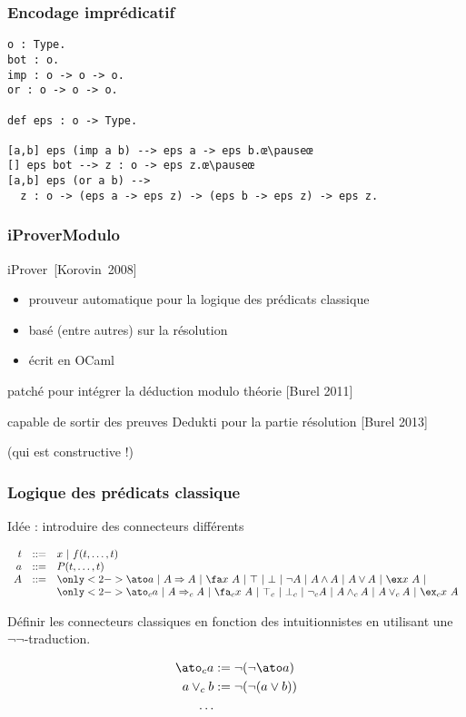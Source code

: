 \documentclass[12pt,aspectratio=169]{beamer}
\begin{document}
\begin{frame}[fragile]
  \frametitle{Encodage imprédicatif}
\begin{lstlisting}
o : Type.
bot : o.
imp : o -> o -> o.
or : o -> o -> o.

def eps : o -> Type.

[a,b] eps (imp a b) --> eps a -> eps b.œ\pauseœ
[] eps bot --> z : o -> eps z.œ\pauseœ
[a,b] eps (or a b) -->
  z : o -> (eps a -> eps z) -> (eps b -> eps z) -> eps z.
\end{lstlisting}


\end{frame}

\begin{frame}
\frametitle{iProverModulo}
iProver~[Korovin~2008] 
\begin{itemize}
\item prouveur automatique pour la logique des prédicats classique
\item basé (entre autres) sur la résolution
\item écrit en OCaml
\end{itemize}
\medskip

patché pour intégrer la déduction modulo théorie [Burel 2011]
\medskip

capable de sortir des preuves Dedukti pour la partie résolution [Burel 2013]

(qui est constructive !)
\end{frame}


\begin{frame}[fragile]
  \frametitle{Logique des prédicats classique}
  Idée : introduire des connecteurs différents
  
 $$
  \begin{array}{r@{~~~::=~~~}l}
    t & x~|~f(t,\ldots,t)\\
    a & P(t,\ldots,t)\\
  A&\only<2->{\ato}a~|~A \Rightarrow
  A~|~\fa x~A~|~\top~|~\bot~|~\neg A~|~A \wedge A~|~A \vee A~|~\ex
  x~A~|~\\
  \multicolumn{1}{c}{}&\only<2->{\ato_c}a~|~A \Rightarrow_c
  A~|~\fa_c x~A~|~\top_c~|~\bot_c~|~\neg_c A~|~A \wedge_c A~|~A \vee_c A~|~\ex_c x~A
  \end{array}
  $$
  
  Définir les connecteurs classiques en fonction des intuitionnistes
  en utilisant une $\neg\neg$-traduction.

  \begin{align*}
    \ato_c a&:= \neg(\neg\ato a)\\
    a\vee_c b&:= \neg(\neg(a\vee b))\\
    \dots
  \end{align*}
\end{frame}
\end{document}
